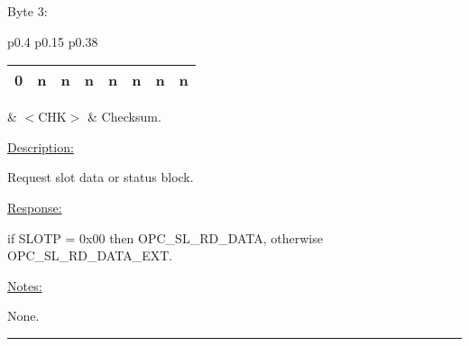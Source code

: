 Byte 3:

\begin{tabular}{p{0.4\linewidth} p{0.15\linewidth} p{0.38\linewidth}} 

\begin{tabular}{|p{0.3cm}|p{0.3cm}|p{0.3cm}|p{0.3cm}|p{0.3cm}|p{0.3cm}|p{0.3cm}|p{0.3cm}|}
\hline
0 & n & n & n & n & n & n & n\\
\hline
\end{tabular}
& $<$CHK$>$ & Checksum.

\end{tabular}

\underline{Description:}

Request slot data or status block.

\underline{Response:} 

if SLOTP = 0x00 then OPC\_SL\_RD\_DATA, otherwise OPC\_SL\_RD\_DATA\_EXT.

\underline{Notes:} 

None.

\rule{15.1cm}{0.4pt}
